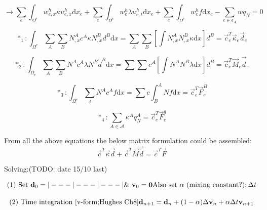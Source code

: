 \begin{equation}\label{femdiffeq6}
\rightarrow \sum_e \int_{\Omega^e} w_{e,x}^h \kappa u_{e,x}^h \text{d}x_e + \sum_e \int_{\Omega^e} w_e^h \lambda u_{e,t}^h \text{d}x_e + \sum_e \int_{\Omega^e} w_e^h f \text{d}x_e - \sum_{e \in \epsilon_A} w q_N = 0
\end{equation}

\begin{equation*}
*_1: \int_{\Omega^e} \sum_A \sum_B N_{,x}^A c^A \kappa N_{,x}^B d^B \text{d}x = \sum_A\sum_B \left[ \int N_{,x}^A N_{,x}^B \kappa \text{d}x  \right]d^B = \vec{c}_e^T \vec{\kappa}_e \vec{d}_e
\end{equation*}


\begin{equation*}
*_2: \int_{\Omega_e} \sum_A \sum_B N^A c^A \lambda N^B \dot{d}^B \text{d}x = \sum\sum c^A \left[ \int N^A N^B \lambda \text{d}x \right] d^B = \vec{c}_e^T \vec{M}_e \vec{\dot{d}}_e
\end{equation*}


\begin{equation*}
*_3: \int_{\Omega^e} \sum_A N^A c^A f \text{d}x = \sum c \int_B^A N f \text{d}x = \vec{c}_e^T \vec{F}_e^B
\end{equation*}


\begin{equation*}
*_4: \sum_{A \in \mathcal{A}} \kappa^A q_N^A = \vec{c}_e^T \vec{F}_e^q
\end{equation*}


From all the above equations the below matrix formulation could be assembled:
\begin{equation}\label{femdiffeq7}
\vec{c}^T \vec{\kappa} \vec{d} + \vec{c}^T \vec{M} \vec{\dot{d}} = \vec{c}^T \vec{F}
\end{equation}


Solving:(TODO: date 15/10 last)

\begin{equation}
(1) \text{ Set } \vec{d}_0 = |---|---|---| \\
\&\ \vec{v}_0 = \vec{0} \\
\text{Also set } \alpha \text{ (mixing constant?)} ; \Delta t
\end{equation}


\begin{equation}
(2) \text{ Time integration [v-form;Hughes Ch8]} \\
\vec{d}_{n+1} = \vec{d}_n + (1-\alpha) \Delta \vec{v}_n + \alpha \Delta t \vec{v}_{n+1}
\end{equation}


